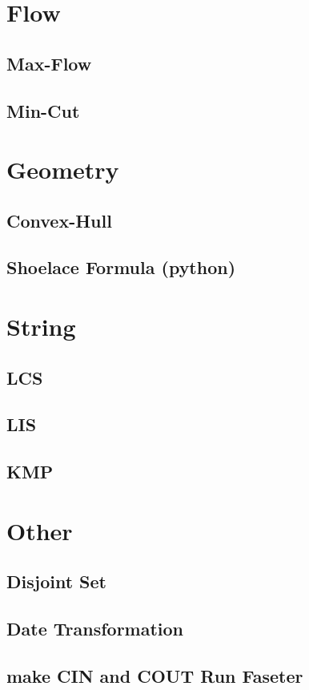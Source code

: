 \documentclass[4pt,twocolumn, landscape, a4paper]{report}
\begin{document}
\section{Flow}

\subsection{Max-Flow}


\subsection{Min-Cut}



\section{Geometry}

\subsection{Convex-Hull}


\subsection{Shoelace Formula (python)}


\section{String}

\subsection{LCS}


\subsection{LIS}


\subsection{KMP}


\section{Other}

\subsection{Disjoint Set}


\subsection{Date Transformation}

\subsection{make CIN and COUT Run Faseter}

\end{document}
